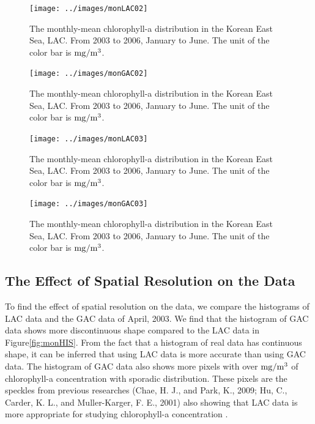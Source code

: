 \begin{figure}[p]
	\centering
	\texttt{[image: ../images/monLAC02]}\\
	\caption{The monthly-mean chlorophyll-a distribution in the Korean East Sea, LAC. From 2003 to 2006, January to June. The unit of the color bar is $\rm mg/m^3$.}
	\label{fig:monLAC02}
\end{figure}

\begin{figure}[p]
	\centering
	\texttt{[image: ../images/monGAC02]}\\
	\caption{The monthly-mean chlorophyll-a distribution in the Korean East Sea, LAC. From 2003 to 2006, January to June. The unit of the color bar is $\rm mg/m^3$.}
	\label{fig:monGAC02}
\end{figure}

\begin{figure}[p]
	\centering
	\texttt{[image: ../images/monLAC03]}\\
	\caption{The monthly-mean chlorophyll-a distribution in the Korean East Sea, LAC. From 2003 to 2006, January to June. The unit of the color bar is $\rm mg/m^3$.}
	\label{fig:monLAC03}
\end{figure}

\begin{figure}[p]
	\centering
	\texttt{[image: ../images/monGAC03]}\\
	\caption{The monthly-mean chlorophyll-a distribution in the Korean East Sea, LAC. From 2003 to 2006, January to June. The unit of the color bar is $\rm mg/m^3$.}
	\label{fig:monGAC03}
\end{figure}


\newpage
\subsection{The Effect of Spatial Resolution on the Data}
 
To find the effect of spatial resolution on the data, we compare the histograms of LAC data and the GAC data of April, 2003. We find that the histogram of GAC data shows more discontinuous shape compared to the LAC data in Figure\ref{fig:monHIS}. From the fact that a histogram of real data has continuous shape, it can be inferred that using LAC data is more accurate than using GAC data. The histogram of GAC data also shows more pixels with over $\rm mg/m^3$ of chlorophyll-a concentration with sporadic distribution. These pixels are the speckles from previous researches (Chae, H. J., and Park, K., 2009; Hu, C., Carder, K. L., and Muller-Karger, F. E., 2001) also showing that LAC data is more appropriate for studying chlorophyll-a concentration \cite{chae2009characteristics,hu2001precise}.
  
